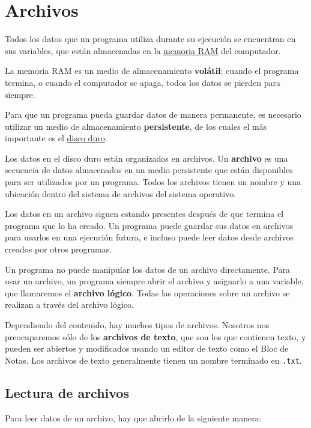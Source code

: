 \chapter{Archivos}

Todos los datos que un programa utiliza durante su ejecución se
encuentran en sus variables, que están almacenadas en la
\href{http://es.wikipedia.org/wiki/Memoria\_RAM}{memoria RAM} del
computador.

La memoria RAM es un medio de almacenamiento \textbf{volátil}: cuando el
programa termina, o cuando el computador se apaga, todos los datos se
pierden para siempre.

Para que un programa pueda guardar datos de manera permanente, es
necesario utilizar un medio de almacenamiento \textbf{persistente}, de
los cuales el más importante es el
\href{http://es.wikipedia.org/wiki/Disco\_duro}{disco duro}.

Los datos en el disco duro están organizados en
archivos.
Un \textbf{archivo} es una secuencia de datos almacenados en un medio
persistente que están disponibles para ser utilizados por un programa.
Todos los archivos tienen un nombre y una ubicación dentro del sistema
de archivos del sistema operativo.

Los datos en un archivo siguen estando presentes después de que termina
el programa que lo ha creado. Un programa puede guardar sus datos en
archivos para usarlos en una ejecución futura, e incluso puede leer
datos desde archivos creados por otros programas.

Un programa no puede manipular los datos de un archivo directamente.
Para usar un archivo, un programa siempre abrir el archivo y asignarlo a
una variable, que llamaremos el \textbf{archivo lógico}. Todas las
operaciones sobre un archivo se realizan a través del archivo lógico.

Dependiendo del contenido, hay muchos tipos de archivos. Nosotros nos
preocuparemos sólo de los \textbf{archivos de texto}, que son los que
contienen texto, y pueden ser abiertos y modificados usando un editor de
texto como el Bloc de Notas. Los archivos de texto generalmente tienen
un nombre terminado en \lstinline!.txt!.

\section{Lectura de archivos}

Para leer datos de un archivo, hay que abrirlo de la siguiente manera:

